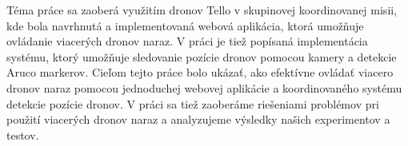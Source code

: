 \documentclass[]{tukediphc}
\begin{document}
\predhovor
Téma práce sa zaoberá využitím dronov Tello v skupinovej koordinovanej misii, kde bola navrhnutá a implementovaná webová aplikácia, ktorá umožňuje ovládanie viacerých dronov naraz. V práci je tiež popísaná implementácia systému, ktorý umožňuje sledovanie pozície dronov pomocou kamery a detekcie Aruco markerov.
Cieľom tejto práce bolo ukázať, ako efektívne ovládať viacero dronov naraz pomocou jednoduchej webovej aplikácie a koordinovaného systému detekcie pozície dronov. V práci sa tiež zaoberáme riešeniami problémov pri použití viacerých dronov naraz a analyzujeme výsledky našich experimentov a testov.
\kpredhovoru

\thispagestyle{empty}
\tableofcontents
\thispagestyle{empty}

\newpage

\thispagestyle{empty}

{	\makeatletter
	\renewcommand{\l@figure}{\@dottedtocline{1}{1.5em}{3.5em}}
	\makeatother
	\listoffigures}



\newpage

\thispagestyle{empty}
\listoftables

\thispagestyle{empty}
\newpage
 
\thispagestyle{empty}
\printglossary %
\newpage

\slovnikterminov
\end{document}
